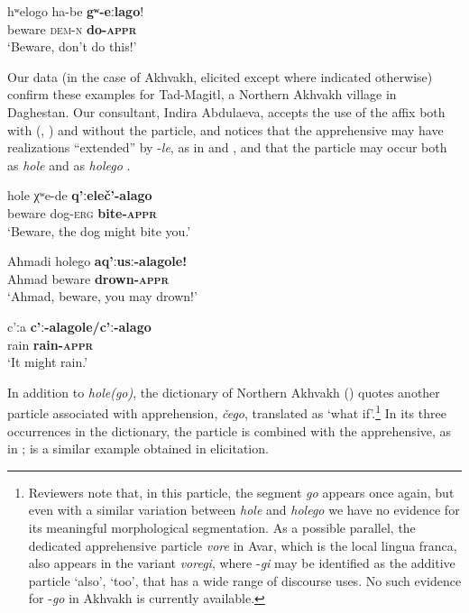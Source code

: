 \documentclass[output=paper,colorlinks,citecolor=brown]{langscibook}
\begin{document}
\ea \label{ex:DD61}
\gll hʷelogo ha-be \textbf{gʷ-eːlago}! \\
beware \textsc{dem-n} \textbf{do-\textsc{appr}} \\
\glt `Beware, don't do this!' \citep{Creisselsunpublished1}
\z

 Our data (in the case of Akhvakh, elicited except where indicated otherwise) confirm these examples for Tad-Magitl, a Northern Akhvakh village in Daghestan. Our consultant, Indira Abdulaeva, accepts the use of the affix both with (, ) and without  the particle, and notices that the apprehensive may have realizations ``extended'' by \nobreakdash-\textit{le}, as in  and , and that the particle may occur both as \textit{hole}  and as \textit{holego} .

\ea \label{ex:DD62}
\gll hole χʷe-de \textbf{q'ːeleč'-alago} \\
beware dog-\textsc{erg} \textbf{bite-\textsc{appr}} \\
\glt `Beware, the dog might bite you.'
\z

\ea \label{ex:DD63}
\gll Aħmadi holego \textbf{aq'ːusː-alagole!} \\
Ahmad beware \textbf{drown-\textsc{appr}} \\
\glt `Ahmad, beware, you may drown!'
\z

\ea \label{ex:DD64}
\gll c'ːa \textbf{c'ː-alagole\textup{/}c'ː-alago} \\
rain \textbf{rain-\textsc{appr}} \\
\glt `It might rain.'
\z

 In addition to \textit{hole(go)}, the dictionary of Northern Akhvakh (\citealt{MagomedovaAbdulaeva2007}) quotes another particle associated with apprehension, \textit{čego}, translated as `what if'.\footnote{Reviewers note that, in this particle, the segment \textit{go} appears once again, but even with a similar variation between \textit{hole} and \textit{holego} we have no evidence for its meaningful morphological segmentation. As a possible parallel, the dedicated apprehensive particle \textit{vore} in Avar, which is the local lingua franca, also appears in the variant \textit{voregi}, where \nobreakdash-\textit{gi} may be identified as the additive particle `also', `too', that has a wide range of discourse uses. No such evidence for \nobreakdash-\textit{go} in Akhvakh is currently available.} In its three occurrences in the dictionary, the particle is combined with the apprehensive, as in ;  is a similar example obtained in elicitation.
\end{document}
